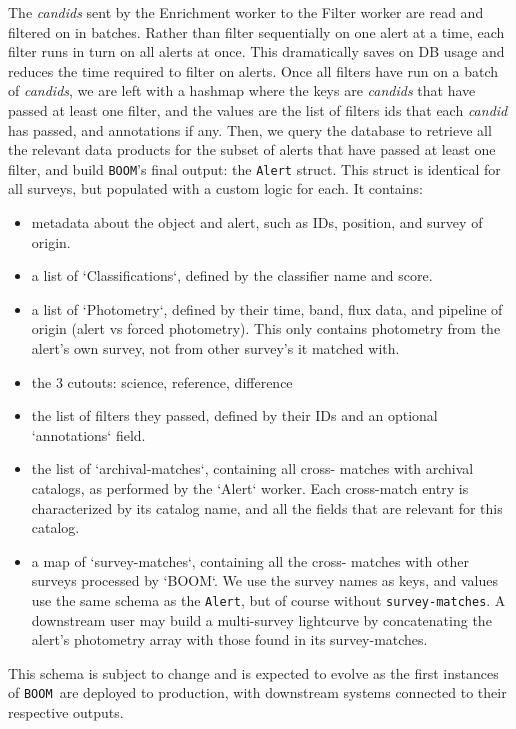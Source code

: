 \documentclass[twocolumn]{aastex631}
\newcommand{\boom}{\texttt{BOOM }}
\begin{document}
The \textit{candids} sent by the Enrichment worker to the Filter worker are read and filtered on in batches. Rather than filter sequentially on one alert at a time, each filter runs in turn on all alerts at once. This dramatically saves on DB usage and reduces the time required to filter on alerts. Once all filters have run on a batch of \textit{candids}, we are left with a hashmap where the keys are \textit{candids} that have passed at least one filter, and the values are the list of filters ids that each \textit{candid} has passed, and annotations if any. Then, we query the database to retrieve all the relevant data products for the subset of alerts that have passed at least one filter, and build \texttt{BOOM}'s final output: the \texttt{Alert} struct. This struct is identical for all surveys, but populated with a custom logic for each. It contains:
\begin{itemize}
    \item metadata about the object and alert, such as IDs,
        position, and survey of origin.
    \item a list of `Classifications`, defined by the classifier
        name and score.
    \item a list of `Photometry`, defined by their time, band,
        flux data, and pipeline of origin (alert vs forced
        photometry). This only contains photometry from the alert's own survey, not from other survey's it matched with.
    \item the 3 cutouts: science, reference, difference
    \item the list of filters they passed, defined by their
        IDs and an optional `annotations` field.
    \item the list of `archival-matches`, containing all cross-
        matches with archival catalogs, as performed by the
        `Alert` worker. Each cross-match entry is characterized
        by its catalog name, and all the fields that are relevant
        for this catalog.
    \item a map of `survey-matches`, containing all the cross-
        matches with other surveys processed by `BOOM`. We use the survey names as keys, and values use the same schema as the \texttt{Alert}, but of course without \texttt{survey-matches}. A downstream user may build a multi-survey lightcurve by concatenating the alert's photometry array with those found in its survey-matches.
\end{itemize}

This schema is subject to change and is expected to evolve as the first instances of \boom are deployed to production, with downstream systems connected to their respective outputs.
\end{document}
